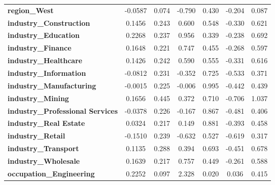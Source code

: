 \begin{center}
\begin{tabular}{lcccccc}
\textbf{region\_West}                    &      -0.0587  &        0.074     &    -0.790  &         0.430        &       -0.204    &        0.087     \\
\textbf{industry\_Construction}          &       0.1456  &        0.243     &     0.600  &         0.548        &       -0.330    &        0.621     \\
\textbf{industry\_Education}             &       0.2268  &        0.237     &     0.956  &         0.339        &       -0.238    &        0.692     \\
\textbf{industry\_Finance}               &       0.1648  &        0.221     &     0.747  &         0.455        &       -0.268    &        0.597     \\
\textbf{industry\_Healthcare}            &       0.1426  &        0.242     &     0.590  &         0.555        &       -0.331    &        0.616     \\
\textbf{industry\_Information}           &      -0.0812  &        0.231     &    -0.352  &         0.725        &       -0.533    &        0.371     \\
\textbf{industry\_Manufacturing}         &      -0.0015  &        0.225     &    -0.006  &         0.995        &       -0.442    &        0.439     \\
\textbf{industry\_Mining}                &       0.1656  &        0.445     &     0.372  &         0.710        &       -0.706    &        1.037     \\
\textbf{industry\_Professional Services} &      -0.0378  &        0.226     &    -0.167  &         0.867        &       -0.481    &        0.406     \\
\textbf{industry\_Real Estate}           &       0.0324  &        0.217     &     0.149  &         0.881        &       -0.393    &        0.458     \\
\textbf{industry\_Retail}                &      -0.1510  &        0.239     &    -0.632  &         0.527        &       -0.619    &        0.317     \\
\textbf{industry\_Transport}             &       0.1135  &        0.288     &     0.394  &         0.693        &       -0.451    &        0.678     \\
\textbf{industry\_Wholesale}             &       0.1639  &        0.217     &     0.757  &         0.449        &       -0.261    &        0.588     \\
\textbf{occupation\_Engineering}         &       0.2252  &        0.097     &     2.328  &         0.020        &        0.036    &        0.415     \\

\end{tabular}
\end{center}
